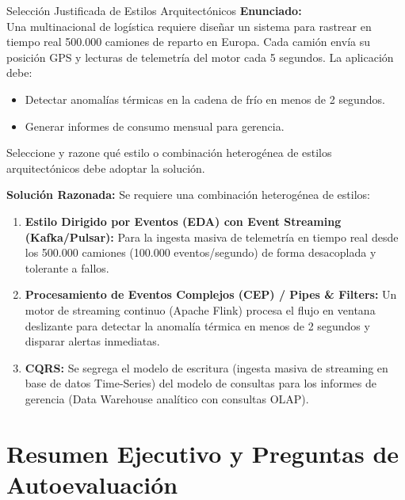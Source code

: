 \begin{ejercicioresuelto}{Selección Justificada de Estilos Arquitectónicos}
\textbf{Enunciado:}\\
Una multinacional de logística requiere diseñar un sistema para rastrear en tiempo real 500.000 camiones de reparto en Europa. Cada camión envía su posición GPS y lecturas de telemetría del motor cada 5 segundos. La aplicación debe:
\begin{itemize}
  \item Detectar anomalías térmicas en la cadena de frío en menos de 2 segundos.
  \item Generar informes de consumo mensual para gerencia.
\end{itemize}
Seleccione y razone qué estilo o combinación heterogénea de estilos arquitectónicos debe adoptar la solución.

\vspace{0.5em}
\textbf{Solución Razonada:}
Se requiere una combinación heterogénea de estilos:
\begin{enumerate}[leftmargin=1.5em]
  \item \textbf{Estilo Dirigido por Eventos (EDA) con Event Streaming (Kafka/Pulsar):} Para la ingesta masiva de telemetría en tiempo real desde los 500.000 camiones (100.000 eventos/segundo) de forma desacoplada y tolerante a fallos.
  \item \textbf{Procesamiento de Eventos Complejos (CEP) / Pipes \& Filters:} Un motor de streaming continuo (Apache Flink) procesa el flujo en ventana deslizante para detectar la anomalía térmica en menos de 2 segundos y disparar alertas inmediatas.
  \item \textbf{CQRS:} Se segrega el modelo de escritura (ingesta masiva de streaming en base de datos Time-Series) del modelo de consultas para los informes de gerencia (Data Warehouse analítico con consultas OLAP).
\end{enumerate}
\end{ejercicioresuelto}

\section{Resumen Ejecutivo y Preguntas de Autoevaluación}
\label{sec:resumen-tema2}


